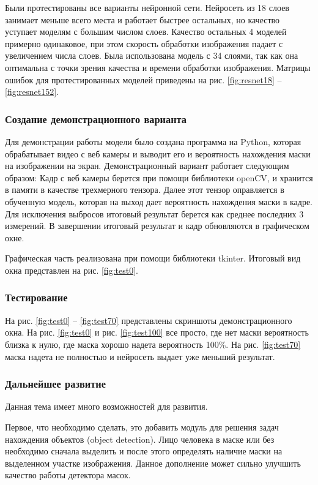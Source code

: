 \documentclass[a4paper,14pt]{article}
\begin{document}
	Были протестированы все варианты нейронной сети.
	Нейросеть из 18 слоев занимает меньше всего места и работает быстрее остальных, но качество уступает моделям с большим числом слоев.
	Качество остальных 4 моделей примерно одинаковое, при этом скорость обработки изображения падает с увеличением числа слоев.
	Была использована модель с 34 слоями, так как она оптимальна с точки зрения качества и времени обработки изображения.
	Матрицы ошибок для протестированных моделей приведены на рис. \ref{fig:resnet18} -- \ref{fig:resnet152}.
	
	\subsubsection{Создание демонстрационного варианта}
	
	Для демонстрации работы модели было создана программа на Python, которая обрабатывает видео с веб камеры и выводит его и вероятность нахождения маски на изображении на экран.
	Демонстрационный вариант работает следующим образом:
	Кадр с веб камеры берется при помощи библиотеки openCV, и хранится в памяти в качестве трехмерного тензора.
	Далее этот тензор оправляется в обученную модель, которая на выход дает вероятность нахождения маски в кадре.
	Для исключения выбросов итоговый результат берется как среднее последних 3 измерений.
	В завершении итоговый результат и кадр обновляются в графическом окне.
	
	Графическая часть реализована при помощи библиотеки tkinter.
	Итоговый вид окна представлен на рис. \ref{fig:test0}.
	
	
	\subsubsection{Тестирование}
	
	На рис. \ref{fig:test0} -- \ref{fig:test70} представлены скриншоты демонстрационного окна.
	На рис. \ref{fig:test0} и рис. \ref{fig:test100} все просто, где нет маски вероятность близка к нулю, где маска хорошо надета вероятность 100\%.
	На рис. \ref{fig:test70} маска надета не полностью и нейросеть выдает уже меньший результат. 
	
	\subsubsection{Дальнейшее развитие}
	
	Данная тема имеет много возможностей для развития.
	
	Первое, что необходимо сделать, это добавить модуль для решения задач нахождения объектов (object detection).
	Лицо человека в маске или без необходимо сначала выделить и после этого определять наличие маски на выделенном участке изображения.
	Данное дополнение может сильно улучшить качество работы детектора масок.
	
\end{document}
